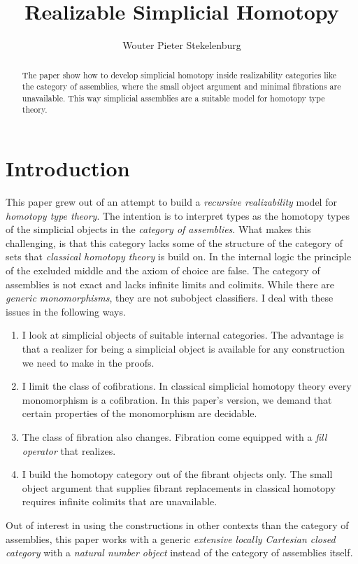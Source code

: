 \documentclass{tac}
\title{Realizable Simplicial Homotopy}
\author{Wouter Pieter Stekelenburg}\copyrightyear{2015}
\newcommand\hide[1]{}
\begin{document}
\begin{abstract} The paper show how to develop simplicial homotopy inside realizability categories like the category of assemblies, where the small object argument and minimal fibrations are unavailable. This way simplicial assemblies are a suitable model for homotopy type theory.\end{abstract}

\maketitle

\hide{
Thorough investigation of the background. If we have an ELCCC then the poset-reflection is a Heyting algebra. The reindexing morphisms between the poset reflections are Heyting algebra morphisms and its adjoints remain adjoints.

}

\section{Introduction}
This paper grew out of an attempt to build a \emph{recursive realizability} model for \emph{homotopy type theory}. The intention is to interpret types as the homotopy types of the simplicial objects in the \emph{category of assemblies}. What makes this challenging, is that this category lacks some of the structure of the category of sets that \emph{classical homotopy theory} is build on. In the internal logic the principle of the excluded middle and the axiom of choice are false. The category of assemblies is not exact and lacks infinite limits and colimits. While there are \emph{generic monomorphisms}, they are not subobject classifiers. I deal with these issues in the following ways.
\begin{enumerate}
\item I look at simplicial objects of suitable internal categories. The advantage is that a realizer for being a simplicial object is available for any construction we need to make in the proofs.
\item I limit the class of cofibrations. In classical simplicial homotopy theory every monomorphism is a cofibration. In this paper's version, we demand that certain properties of the monomorphism are decidable.
\item The class of fibration also changes. Fibration come equipped with a \emph{fill operator} that realizes.
\item I build the homotopy category out of the fibrant objects only. The small object argument that supplies fibrant replacements in classical homotopy requires infinite colimits that are unavailable.
\end{enumerate}
Out of interest in using the constructions in other contexts than the category of assemblies, this paper works with a generic \emph{extensive locally Cartesian closed category} with a \emph{natural number object} instead of the category of assemblies itself.
\end{document}
